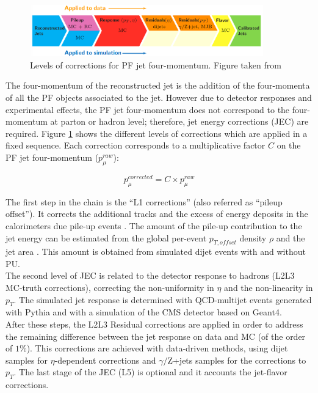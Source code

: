 \begin{figure}[ht]%
  \begin{center}
    \includegraphics[width=0.9\textwidth]{figuras/Chapter3/JEC_levels.png}
    \caption{Levels of corrections for PF jet four-momentum. Figure taken from \cite{JESandJER}}
    \label{fig:JEC_levels}
  \end{center}
\end{figure}

The four-momentum of the reconstructed jet is the addition of the four-momenta of all the PF objects associated to the jet. However
due to detector responses and experimental effects, the PF jet four-momentum does not correspond to the four-momentum
at parton or hadron level; therefore, jet energy corrections (JEC) are required. Figure \ref{fig:JEC_levels} shows the different
levels of corrections which are applied in a fixed sequence. Each correction corresponds to a multiplicative factor $C$ on
the PF jet four-momentum ($p_{\mu}^{raw}$):

\begin{equation}
 p_{\mu}^{corrected} = C \times p_{\mu}^{raw}
\end{equation}

The first step in the chain is the ``L1 corrections'' (also referred as ``pileup offset''). It corrects the additional tracks and the excess of energy deposits
in the calorimeters due pile-up events . The amount of the pile-up contribution
to the jet energy can be estimated from the global per-event $p_{T,offset}$ density $\rho$ and the jet area \cite{JECpileup}. This amount
is obtained from simulated dijet events with and without PU. \\

The second level of JEC is related to the detector response to hadrons (L2L3 MC-truth corrections), correcting
the non-uniformity in $\eta$ and the non-linearity in $p_{T}$. The simulated jet response is determined
with QCD-multijet events generated with Pythia and with a simulation of the CMS detector based
on Geant4.\\

After these steps, the L2L3 Residual corrections are applied in order to address the remaining difference
between the jet response on data and MC (of the order of $1 \%$). This corrections are achieved with data-driven methods, using
dijet samples for $\eta$-dependent corrections and $\gamma /$Z+jets samples for the corrections to $p_{T}$. The last stage
of the JEC (L5) is optional and it accounts the jet-flavor corrections. \\

